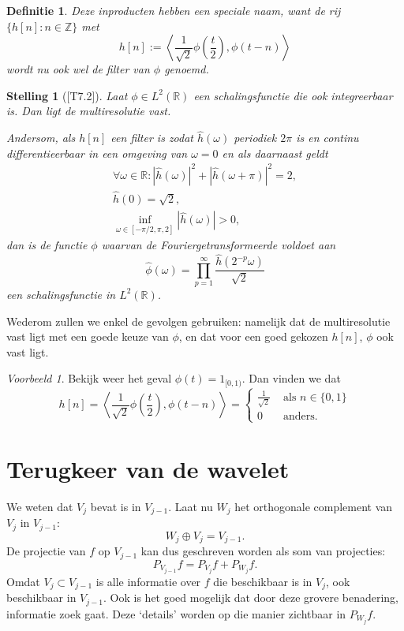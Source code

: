\documentclass[11pt]{report}
\newcommand{\R}{\mathbb{R}}
\newcommand{\Z}{\mathbb{Z}}
\theoremstyle{plain}
\newtheorem*{stelling}{Stelling}
\newtheorem*{definitie}{Definitie}
\theoremstyle{remark}
\newtheorem*{voorbeeld}{Voorbeeld}
\begin{document}
\begin{definitie}
Deze inproducten hebben een speciale naam, want de rij $\{h[n]: n \in \Z\}$ met
\[
  h[n] := \left\langle \frac{1}{\sqrt{2}} \phi\left(\frac{t}{2}\right), \phi(t-n) \right\rangle
\]
wordt nu ook wel de \emph{filter} van $\phi$ genoemd.
\end{definitie}
\begin{stelling}[{\cite{mallat}[T7.2]}]
  \label{filter}
  Laat $\phi \in L^2(\R)$ een schalingsfunctie die ook integreerbaar is. Dan ligt de multiresolutie vast.

  Andersom, als $h[n]$ een filter is zodat $\hat{h}(\omega)$ periodiek $2\pi$ is en continu differentieerbaar in een omgeving van $\omega = 0$ en als daarnaast geldt
  \begin{align*}
    \forall \omega \in \R: | \hat{h}(\omega)|^2 + |\hat{h}(\omega + \pi)|^2 = 2, \\
    \hat{h}(0) = \sqrt{2}, \\
    \inf_{\omega \in [-\pi/2, \pi,2]} |\hat{h}(\omega)| > 0,
  \end{align*}
  dan is de functie $\phi$ waarvan de Fouriergetransformeerde voldoet aan
  \[
    \hat{\phi}(\omega) = \prod_{p=1}^\infty \frac{\hat{h}(2^{-p}\omega)}{\sqrt{2}}
  \]
  een schalingsfunctie in $L^2(\R)$.
\end{stelling}
Wederom zullen we enkel de gevolgen gebruiken: namelijk dat de multiresolutie vast ligt met een goede keuze van $\phi$, en dat voor een goed gekozen $h[n]$, $\phi$ ook vast ligt.

\begin{voorbeeld}
Bekijk weer het geval $\phi(t) = 1_{[0,1)}$. Dan vinden we dat
\[
  h[n] = \left\langle \frac{1}{\sqrt{2}} \phi\left(\frac{t}{2}\right), \phi(t-n) \right\rangle = \begin{cases} \frac{1}{\sqrt{2}} & \text{ als } n \in \{0,1\} \\ 0 & \text{ anders.} \end{cases}
\]
\end{voorbeeld}

\section{Terugkeer van de wavelet}
We weten dat $V_j$ bevat is in $V_{j-1}$. Laat nu $W_j$ het orthogonale complement van $V_j$ in $V_{j-1}$:
\[
	W_j \oplus V_j = V_{j-1}.
\]
De projectie van $f$ op $V_{j-1}$ kan dus geschreven worden als som van projecties:
\[
	P_{V_{j-1}} f = P_{V_j} f + P_{W_j} f.
\]
Omdat $V_j \subset V_{j-1}$ is alle informatie over $f$ die beschikbaar is in $V_j$, ook beschikbaar in $V_{j-1}$. Ook is het goed mogelijk dat door deze grovere benadering, informatie zoek gaat. Deze `details' worden op die manier zichtbaar in $P_{W_j} f$.
\end{document}
